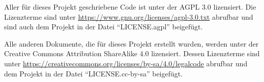 Aller für dieses Projekt geschriebene Code ist unter der AGPL 3.0 lizensiert. Die Lizenzterme sind unter \url{https://www.gnu.org/licenses/agpl-3.0.txt} abrufbar und sind auch dem Projekt in der Datei ``LICENSE.agpl'' beigefügt.

Alle anderen Dokumente, die für dieses Projekt erstellt wurden, werden unter der Creative Commons Attribution ShareAlike 4.0 lizensiert. Dessen Lizenzterme sind unter \url{https://creativecommons.org/licenses/by-sa/4.0/legalcode} abrufbar und dem Projekt in der Datei ``LICENSE.cc-by-sa'' beigefügt.
